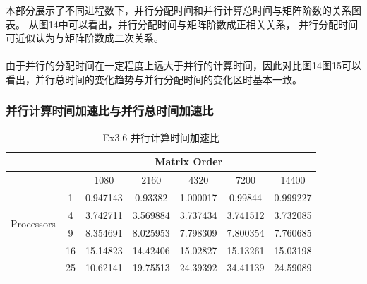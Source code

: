 \documentclass[UTF8]{article}
\begin{document}
    本部分展示了不同进程数下，并行分配时间和并行计算总时间与矩阵阶数的关系图表。
    从图14中可以看出，并行分配时间与矩阵阶数成正相关关系，
    并行分配时间可近似认为与矩阵阶数成二次关系。\\\\

    由于并行的分配时间在一定程度上远大于并行的计算时间，因此对比图14图15可以看出，并行总时间的变化趋势与并行分配时间的变化区时基本一致。

    \clearpage

\subsubsection{并行计算时间加速比与并行总时间加速比}

        \begin{table}[h]
            \caption{Ex3.6 并行计算时间加速比}
            \label{tab:my-table}
            \centering
            \scalebox{0.8} {
            \begin{tabular}{|c|c|c|c|c|c|c|}
            \hline
                                        & \multicolumn{6}{c|}{Matrix Order}                         \\ \hline
            \multirow{6}{*}{Processors} &    & 1080     & 2160     & 4320     & 7200     & 14400    \\ \cline{2-7} 
                                        & 1  & 0.947143 & 0.93382  & 1.000017 & 0.99844  & 0.999227 \\ \cline{2-7} 
                                        & 4  & 3.742711 & 3.569884 & 3.737434 & 3.741512 & 3.732085 \\ \cline{2-7} 
                                        & 9  & 8.354691 & 8.025953 & 7.798309 & 7.800354 & 7.760685 \\ \cline{2-7} 
                                        & 16 & 15.14823 & 14.42406 & 15.02827 & 15.13261 & 15.03198 \\ \cline{2-7} 
                                        & 25 & 10.62141 & 19.75513 & 24.39392 & 34.41139 & 24.59089 \\ \hline
            \end{tabular}}
            \end{table}
\end{document}
